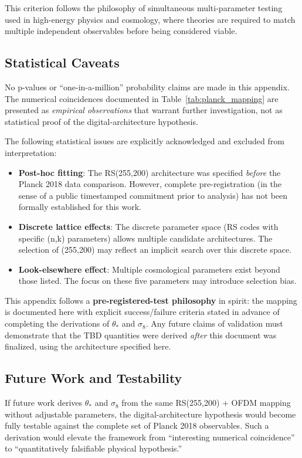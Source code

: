 This criterion follows the philosophy of simultaneous multi-parameter testing used in high-energy physics and cosmology, where theories are required to match multiple independent observables before being considered viable.

\subsection{Statistical Caveats}

No p-values or ``one-in-a-million'' probability claims are made in this appendix. The numerical coincidences documented in Table~\ref{tab:planck_mapping} are presented as \emph{empirical observations} that warrant further investigation, not as statistical proof of the digital-architecture hypothesis.

The following statistical issues are explicitly acknowledged and excluded from interpretation:

\begin{itemize}
\item \textbf{Post-hoc fitting}: The RS(255,200) architecture was specified \emph{before} the Planck 2018 data comparison. However, complete pre-registration (in the sense of a public timestamped commitment prior to analysis) has not been formally established for this work.
\item \textbf{Discrete lattice effects}: The discrete parameter space (RS codes with specific (n,k) parameters) allows multiple candidate architectures. The selection of (255,200) may reflect an implicit search over this discrete space.
\item \textbf{Look-elsewhere effect}: Multiple cosmological parameters exist beyond those listed. The focus on these five parameters may introduce selection bias.
\end{itemize}

This appendix follows a \textbf{pre-registered-test philosophy} in spirit: the mapping is documented here with explicit success/failure criteria stated in advance of completing the derivations of $\theta_*$ and $\sigma_8$. Any future claims of validation must demonstrate that the TBD quantities were derived \emph{after} this document was finalized, using the architecture specified here.

\subsection{Future Work and Testability}

If future work derives $\theta_*$ and $\sigma_8$ from the same RS(255,200) + OFDM mapping without adjustable parameters, the digital-architecture hypothesis would become fully testable against the complete set of Planck 2018 observables. Such a derivation would elevate the framework from ``interesting numerical coincidence'' to ``quantitatively falsifiable physical hypothesis.''

